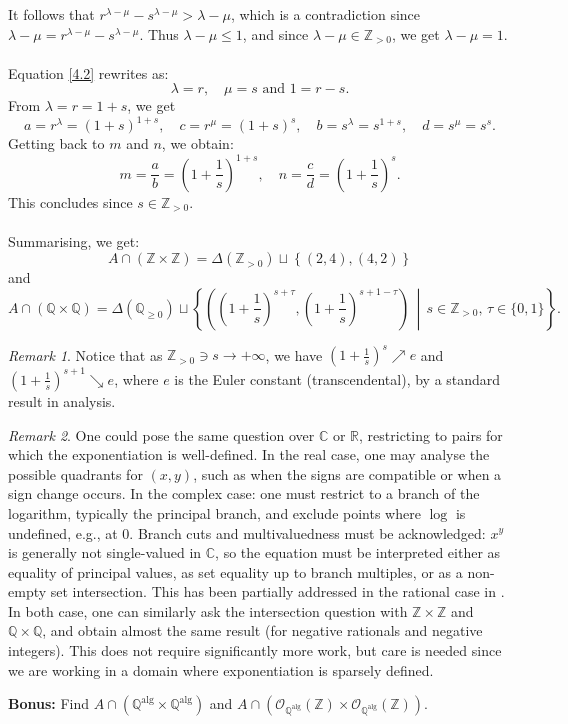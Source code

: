\documentclass[11pt, a4paper, oneside]{article}
\theoremstyle{remark}
\newtheorem*{remark}{Remark}
\theoremstyle{lemma}
\begin{document}
It follows that \( r^{\lambda - \mu} - s^{\lambda - \mu} > \lambda - \mu \), which is a contradiction since \( \lambda - \mu = r^{\lambda - \mu} - s^{\lambda - \mu} \). Thus \( \lambda - \mu \leq 1 \), and since \( \lambda - \mu \in \mathbb{Z}_{>0} \), we get \( \lambda - \mu = 1 \).
\\\\
Equation \eqref{4.2} rewrites as:
\[
    \lambda = r, \quad \mu = s \text{ and } 1 = r - s.
\]
From \( \lambda = r = 1 + s \), we get
\[
    a = r^{\lambda} = (1 + s)^{1 + s}, \quad c = r^{\mu} = (1 + s)^s, \quad
    b = s^{\lambda} = s^{1 + s}, \quad d = s^{\mu} = s^s.
\]
Getting back to \( m \) and \( n \), we obtain:
\[
    m = \frac{a}{b} = \left(1 + \frac{1}{s}\right)^{1 + s}, \quad n = \frac{c}{d} = \left(1 + \frac{1}{s}\right)^s.
\]
This concludes since \(s\in\mathbb{Z}_{>0}\).
\\\\
Summarising, we get:
\[
    A\cap(\mathbb{Z} \times \mathbb{Z}) = \Delta(\mathbb{Z}_{>0}) \sqcup \left\{(2,4), (4,2)\right\}
\]
and
\[
    A \cap (\mathbb{Q} \times \mathbb{Q}) = \Delta(\mathbb{Q}_{\geq 0}) \sqcup \left\{ \left( \left(1 + \frac{1}{s} \right)^{s + \tau}, \left(1 + \frac{1}{s} \right)^{s + 1 - \tau} \right) \,\middle|\, s \in \mathbb{Z}_{>0},\, \tau \in \{0,1\} \right\}.
\]
\begin{remark}
Notice that as \( \mathbb{Z}_{>0}\ni s \to +\infty \), we have \( \left(1 + \frac{1}{s} \right)^{s} \nearrow e \) and \( \left(1 + \frac{1}{s} \right)^{s+1} \searrow e \), where \( e \) is the Euler constant (transcendental), by a standard result in analysis.
\end{remark}

\begin{remark}
    One could pose the same question over \( \mathbb{C} \) or \( \mathbb{R} \), restricting to pairs for which the exponentiation is well-defined. In the real case, one may analyse the possible quadrants for \((x,y)\), such as when the signs are compatible or when a sign change occurs. In the complex case: one must restrict to a branch of the logarithm, typically the principal branch, and exclude points where \(\log\) is undefined, e.g., at \(0\). Branch cuts and multivaluedness must be acknowledged: \(x^y\) is generally not single-valued in \( \mathbb{C} \), so the equation must be interpreted either as equality of principal values, as set equality up to branch multiples, or as a non-empty set intersection. This has been partially addressed in the rational case in \cite{solomon1967Hurwitz}. In both case, one can similarly ask the intersection question with \( \mathbb{Z} \times \mathbb{Z} \) and \( \mathbb{Q} \times \mathbb{Q} \), and obtain almost the same result (for negative rationals and negative integers). This does not require significantly more work, but care is needed since we are working in a domain where exponentiation is sparsely defined.
\end{remark}
\textbf{Bonus:}  
Find \( A \cap \left( \mathbb{Q}^{\mathrm{alg}} \times \mathbb{Q}^{\mathrm{alg}} \right) \) and \( A \cap \left( \mathcal{O}_{\mathbb{Q}^{\mathrm{alg}}}(\mathbb{Z}) \times \mathcal{O}_{\mathbb{Q}^{\mathrm{alg}}}(\mathbb{Z}) \right) \).
\end{document}
